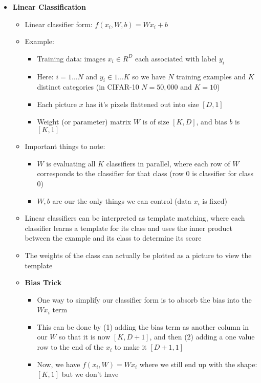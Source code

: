 \documentclass[12pt]{article}
\begin{document}
\begin{itemize}
\begin{itemize}
    \end{itemize}
    \item \textbf{Linear Classification}
    \begin{itemize}
        \item Linear classifier form: $f(x_i, W, b) = Wx_i + b$
        \item Example:
        \begin{itemize}
          \item Training data: images $x_i \in R^D$ each associated with label $y_i$
          \item Here: $i = 1 \dotsc N$ and $y_i \in 1 \dotsc K$ so we have $N$ training examples
          and $K$ distinct categories (in CIFAR-10 $N=50,000$ and $K=10$)
          \item Each picture $x$ has it's pixels flattened out into size $[D, 1]$
          \item Weight (or parameter) matrix $W$ is of size $[K, D]$, and bias $b$ is $[K, 1]$
        \end{itemize}
        \item Important things to note:
        \begin{itemize}
          \item $W$ is evaluating all $K$ classifiers in parallel, where each row of $W$ corresponds
          to the classifier for that class (row 0 is classifier for class 0)
          \item $W, b$ are our the only things we can control (data $x_i$ is fixed)
        \end{itemize}
        \item Linear classifiers can be interpreted as template matching, where each classifier learns a
        template for its class and uses the inner product between the example and its class to determine its score
        \item The weights of the class can actually be plotted as a picture to view the template
        \item \textbf{Bias Trick}
        \begin{itemize}
          \item One way to simplify our classifier form is to absorb the bias into the $Wx_i$ term
          \item This can be done by (1) adding the bias term as another column in our $W$ so that it
          is now $[K, D+1]$, and then (2) adding a one value row to the end of the $x_i$ to make it $[D+1, 1]$
          \item Now, we have $f(x_i, W) = Wx_i$ where we still end up with the shape: $[K, 1]$ but we don't have

\end{itemize}
\end{itemize}
\end{itemize}
\end{document}
